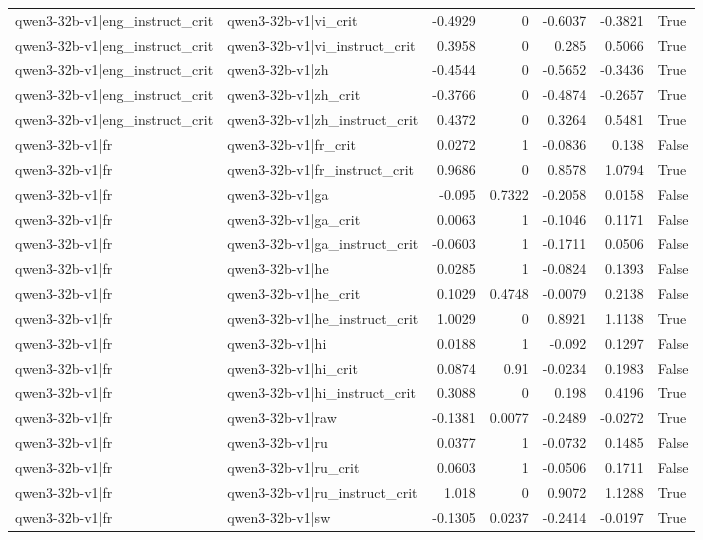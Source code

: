 \begin{table}
\begin{tabular}{l l r r r r l}
qwen3-32b-v1|eng_instruct_crit & qwen3-32b-v1|vi_crit & -0.4929 & 0 & -0.6037 & -0.3821 & True \\
qwen3-32b-v1|eng_instruct_crit & qwen3-32b-v1|vi_instruct_crit & 0.3958 & 0 & 0.285 & 0.5066 & True \\
qwen3-32b-v1|eng_instruct_crit & qwen3-32b-v1|zh & -0.4544 & 0 & -0.5652 & -0.3436 & True \\
qwen3-32b-v1|eng_instruct_crit & qwen3-32b-v1|zh_crit & -0.3766 & 0 & -0.4874 & -0.2657 & True \\
qwen3-32b-v1|eng_instruct_crit & qwen3-32b-v1|zh_instruct_crit & 0.4372 & 0 & 0.3264 & 0.5481 & True \\
qwen3-32b-v1|fr & qwen3-32b-v1|fr_crit & 0.0272 & 1 & -0.0836 & 0.138 & False \\
qwen3-32b-v1|fr & qwen3-32b-v1|fr_instruct_crit & 0.9686 & 0 & 0.8578 & 1.0794 & True \\
qwen3-32b-v1|fr & qwen3-32b-v1|ga & -0.095 & 0.7322 & -0.2058 & 0.0158 & False \\
qwen3-32b-v1|fr & qwen3-32b-v1|ga_crit & 0.0063 & 1 & -0.1046 & 0.1171 & False \\
qwen3-32b-v1|fr & qwen3-32b-v1|ga_instruct_crit & -0.0603 & 1 & -0.1711 & 0.0506 & False \\
qwen3-32b-v1|fr & qwen3-32b-v1|he & 0.0285 & 1 & -0.0824 & 0.1393 & False \\
qwen3-32b-v1|fr & qwen3-32b-v1|he_crit & 0.1029 & 0.4748 & -0.0079 & 0.2138 & False \\
qwen3-32b-v1|fr & qwen3-32b-v1|he_instruct_crit & 1.0029 & 0 & 0.8921 & 1.1138 & True \\
qwen3-32b-v1|fr & qwen3-32b-v1|hi & 0.0188 & 1 & -0.092 & 0.1297 & False \\
qwen3-32b-v1|fr & qwen3-32b-v1|hi_crit & 0.0874 & 0.91 & -0.0234 & 0.1983 & False \\
qwen3-32b-v1|fr & qwen3-32b-v1|hi_instruct_crit & 0.3088 & 0 & 0.198 & 0.4196 & True \\
qwen3-32b-v1|fr & qwen3-32b-v1|raw & -0.1381 & 0.0077 & -0.2489 & -0.0272 & True \\
qwen3-32b-v1|fr & qwen3-32b-v1|ru & 0.0377 & 1 & -0.0732 & 0.1485 & False \\
qwen3-32b-v1|fr & qwen3-32b-v1|ru_crit & 0.0603 & 1 & -0.0506 & 0.1711 & False \\
qwen3-32b-v1|fr & qwen3-32b-v1|ru_instruct_crit & 1.018 & 0 & 0.9072 & 1.1288 & True \\
qwen3-32b-v1|fr & qwen3-32b-v1|sw & -0.1305 & 0.0237 & -0.2414 & -0.0197 & True \\

\end{tabular}
\end{table}
